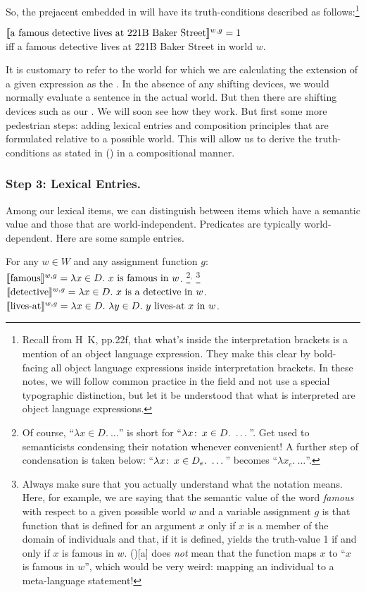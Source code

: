 So, the prejacent embedded in  will have its truth-conditions
described as follows:\footnote{Recall from H\amp\ K, pp.22f, that what's inside
  the interpretation brackets is a mention of an object language expression.
  They make this clear by bold-facing all object language expressions inside
  interpretation brackets. In these notes, we will follow common practice in the
  field and not use a special typographic distinction, but let it be understood
  that what is interpreted are object language expressions.}

\ex $\llbracket \mbox{a famous detective lives at 221B Baker Street} \rrbracket^{w,g} = 1$\\
iff a famous detective lives at 221B Baker Street in world $w$. \xe

It is customary to refer to the world for which we are calculating the extension
of a given expression as the . In the absence of any
shifting devices, we would normally evaluate a sentence in the actual world. But
then there are shifting devices such as our . We will soon see how they work. But first some more pedestrian steps:
adding lexical entries and composition principles that are formulated relative
to a possible world. This will allow us to derive the truth-conditions as stated
in (\lastx) in a compositional manner.

\subsubsection{Step 3: Lexical Entries.} \label{sec:lexical-entries}

Among our lexical items, we can distinguish between items which have a
 semantic value and those that are world-independent.
Predicates are typically world-dependent. Here are some sample entries.

\pex For any $w \in W$ and any assignment function $g$:
\a $\sv{\mbox{famous}}^{w,g} = \lambda x \in D.\ x \mbox{ is famous in }
w$.%
\footnote{Of course, ``$\lambda x \in D.\ \dots$'' is short for
  ``$\lambda x\co x \in D.\ \dots$''. Get used to semanticists
  condensing their notation whenever convenient! A further step of
  condensation is taken below: ``$\lambda x\colon\thinspace x \in D_e.\ \dots$''
  becomes ``$\lambda x_e.\ \dots$''.}$^{,}$%
\footnote{Always make sure that you actually understand what the
  notation means. Here, for example, we are saying that the semantic
  value of the word \emph{famous} with respect to a given possible
  world $w$ and a variable assignment $g$ is that function that is
  defined for an argument $x$ only if $x$ is a member of the domain of
  individuals and that, if it is defined, yields the truth-value 1 if
  and only if $x$ is famous in $w$. (\lastx)[a] does \emph{not} mean that the
  function maps $x$ to ``$x$ is famous in $w$'', which would be very weird:
  mapping an individual to a meta-language statement!}
\a $\llbracket \mbox{detective} \rrbracket^{w,g} = \lambda x \in D.\ x \mbox{ is a
  detective in } w$.
\a $\sv{\mbox{lives-at}}^{w,g} = \lambda x \in D.\ \lambda y \in D.\ y
\mbox{ lives-at } x \mbox{ in } w $.
\xe

